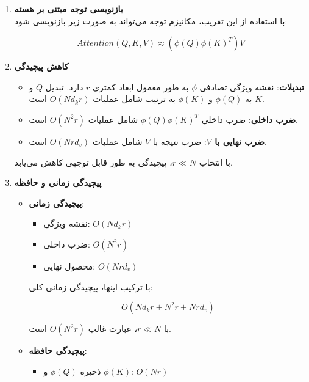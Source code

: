 \begin{qsolve}
	\begin{enumerate}
		
		
			\item \textbf{بازنویسی توجه مبتنی بر هسته}\\
			با استفاده از این تقریب، مکانیزم توجه می‌تواند به صورت زیر بازنویسی شود:
			
			\[ Attention(Q, K, V) \approx \left(\phi(Q) \phi(K)^T \right) V \]
		
		
		
		
			\item \textbf{کاهش پیچیدگی}\\
			\begin{itemize}
					\item \textbf{تبدیلات}: نقشه ویژگی تصادفی \( \phi \) به طور معمول ابعاد کمتری \( r \) دارد. تبدیل \( Q \) و \( K \) به \( \phi(Q) \) و \( \phi(K) \) به ترتیب شامل عملیات \( O(Nd_kr) \) است.
					\item \textbf{ضرب داخلی}: ضرب داخلی \( \phi(Q) \phi(K)^T \) شامل عملیات \( O(N^2 r) \) است.
					\item \textbf{ضرب نهایی با \( V \)}: ضرب نتیجه با \( V \) شامل عملیات \( O(Nrd_v) \) است.
				\end{itemize}
			با انتخاب \( r \ll N \)، پیچیدگی به طور قابل توجهی کاهش می‌یابد.
		
		
		
		
		
		
		\item \textbf{پیچیدگی زمانی و حافظه}\\
		\begin{itemize}
			\item \textbf{پیچیدگی زمانی}:
			\begin{itemize}
				\item نقشه ویژگی: \( O(Nd_kr) \)
				\item ضرب داخلی: \( O(N^2r) \)
				\item محصول نهایی: \( O(Nrd_v) \)
			\end{itemize}
			
			با ترکیب اینها، پیچیدگی زمانی کلی:
			
			\[ O(Nd_kr + N^2r + Nrd_v) \]
			
			با \( r \ll N \)، عبارت غالب \( O(N^2r) \) است.
			
			\item \textbf{پیچیدگی حافظه}:
			\begin{itemize}
				\item ذخیره \( \phi(Q) \) و \( \phi(K) \): \( O(Nr) \)
			\end{itemize}
		\end{itemize}
		
		
		
	\end{enumerate}
	
\end{qsolve}









